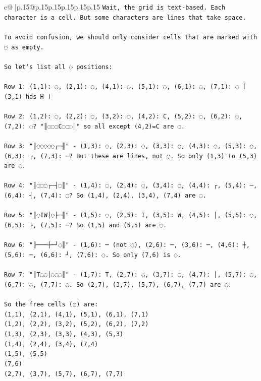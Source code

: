 \documentclass{article}
\begin{document}
{\begin{supertabular}{c@{$\;$}|p{.15\linewidth}@{}p{.15\linewidth}p{.15\linewidth}p{.15\linewidth}p{.15\linewidth}p{.15\linewidth}}
{{{\texttt{Wait, the grid is text{-}based. Each character is a cell. But some characters are lines that take space.} \\
\\ 
\texttt{To avoid confusion, we should only consider cells that are marked with ◌ as empty.} \\
\\ 
\texttt{So let's list all ◌ positions:} \\
\\ 
\texttt{Row 1: (1,1): ◌, (2,1): ◌, (4,1): ◌, (5,1): ◌, (6,1): ◌, (7,1): ◌  {[} (3,1) has H {]}} \\
\\ 
\texttt{Row 2: (1,2): ◌, (2,2): ◌, (3,2): ◌, (4,2): C, (5,2): ◌, (6,2): ◌, (7,2): ◌? "║◌◌◌C◌◌◌║" so all except (4,2)=C are ◌.} \\
\\ 
\texttt{Row 3: "║◌◌◌◌◌┌─╢" {-} (1,3): ◌, (2,3): ◌, (3,3): ◌, (4,3): ◌, (5,3): ◌, (6,3): ┌, (7,3): ─? But these are lines, not ◌. So only (1,3) to (5,3) are ◌.} \\
\\ 
\texttt{Row 4: "║◌◌◌┌─┤◌║" {-} (1,4): ◌, (2,4): ◌, (3,4): ◌, (4,4): ┌, (5,4): ─, (6,4): ┤, (7,4): ◌? So (1,4), (2,4), (3,4), (7,4) are ◌.} \\
\\ 
\texttt{Row 5: "║◌IW│◌├─╢" {-} (1,5): ◌, (2,5): I, (3,5): W, (4,5): │, (5,5): ◌, (6,5): ├, (7,5): ─? So (1,5) and (5,5) are ◌.} \\
\\ 
\texttt{Row 6: "╟───┼─┘◌║" {-} (1,6): ─ (not ◌), (2,6): ─, (3,6): ─, (4,6): ┼, (5,6): ─, (6,6): ┘, (7,6): ◌. So only (7,6) is ◌.} \\
\\ 
\texttt{Row 7: "║T◌◌│◌◌◌║" {-} (1,7): T, (2,7): ◌, (3,7): ◌, (4,7): │, (5,7): ◌, (6,7): ◌, (7,7): ◌. So (2,7), (3,7), (5,7), (6,7), (7,7) are ◌.} \\
\\ 
\texttt{So the free cells (◌) are:} \\
\texttt{(1,1), (2,1), (4,1), (5,1), (6,1), (7,1)} \\
\texttt{(1,2), (2,2), (3,2), (5,2), (6,2), (7,2)} \\
\texttt{(1,3), (2,3), (3,3), (4,3), (5,3)} \\
\texttt{(1,4), (2,4), (3,4), (7,4)} \\
\texttt{(1,5), (5,5)} \\
\texttt{(7,6)} \\
\texttt{(2,7), (3,7), (5,7), (6,7), (7,7)} \\
}}}
\end{supertabular}}
\end{document}
